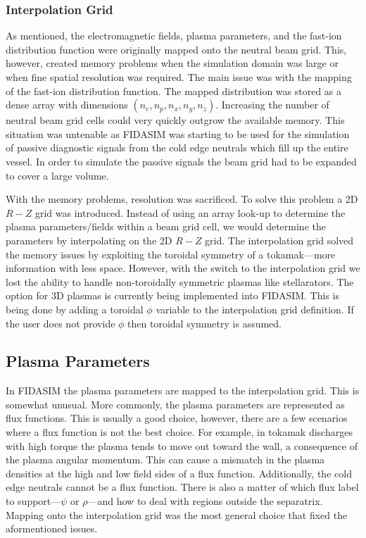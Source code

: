 \subsubsection{Interpolation Grid}
As mentioned, the electromagnetic fields, plasma parameters, and the fast-ion distribution function were originally mapped onto the neutral beam grid. This, however, created memory problems when the simulation domain was large or when fine spatial resolution was required. The main issue was with the mapping of the fast-ion distribution function. The mapped distribution was stored as a dense array with dimensions $(n_e,n_p,n_x,n_y,n_z)$. Increasing the number of neutral beam grid cells could very quickly outgrow the available memory. This situation was untenable as FIDASIM was starting to be used for the simulation of passive diagnostic signals from the cold edge neutrals which fill up the entire vessel. In order to simulate the passive signals the beam grid had to be expanded to cover a large volume. 

With the memory problems, resolution was sacrificed. To solve this problem a 2D $R-Z$ grid was introduced. Instead of using an array look-up to determine the plasma parameters/fields within a beam grid cell, we would determine the parameters by interpolating on the 2D $R-Z$ grid. The interpolation grid solved the memory issues by exploiting the toroidal symmetry of a tokamak---more information with less space. However, with the switch to the interpolation grid we lost the ability to handle non-toroidally symmetric plasmas like stellarators. The option for 3D plasmas is currently being implemented into FIDASIM. This is being done by adding a toroidal $\phi$ variable to the interpolation grid definition. If the user does not provide $\phi$ then toroidal symmetry is assumed.

\subsection{Plasma Parameters}
In FIDASIM the plasma parameters are mapped to the interpolation grid. This is somewhat unusual. More commonly, the plasma parameters are represented as flux functions. This is usually a good choice, however, there are a few scenarios where a flux function is not the best choice. For example, in tokamak discharges with high torque the plasma tends to move out toward the wall, a consequence of the plasma angular momentum. This can cause a mismatch in the plasma densities at the high and low field sides of a flux function. Additionally, the cold edge neutrals cannot be a flux function. There is also a matter of which flux label to support---$\psi$ or $\rho$---and how to deal with regions outside the separatrix. Mapping onto the interpolation grid was the most general choice that fixed the aformentioned issues.

